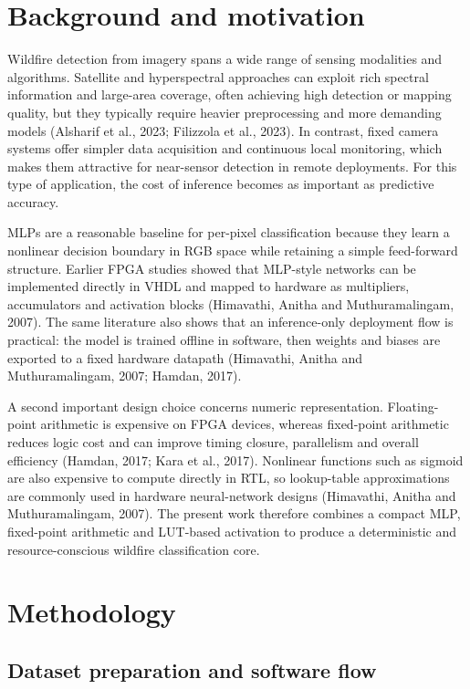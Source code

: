 \documentclass[11pt,a4paper]{article}
\begin{document}
\section{Background and motivation}

Wildfire detection from imagery spans a wide range of sensing modalities and algorithms. Satellite and hyperspectral approaches can exploit rich spectral information and large-area coverage, often achieving high detection or mapping quality, but they typically require heavier preprocessing and more demanding models (Alsharif et al., 2023; Filizzola et al., 2023). In contrast, fixed camera systems offer simpler data acquisition and continuous local monitoring, which makes them attractive for near-sensor detection in remote deployments. For this type of application, the cost of inference becomes as important as predictive accuracy.

MLPs are a reasonable baseline for per-pixel classification because they learn a nonlinear decision boundary in RGB space while retaining a simple feed-forward structure. Earlier FPGA studies showed that MLP-style networks can be implemented directly in VHDL and mapped to hardware as multipliers, accumulators and activation blocks (Himavathi, Anitha and Muthuramalingam, 2007). The same literature also shows that an inference-only deployment flow is practical: the model is trained offline in software, then weights and biases are exported to a fixed hardware datapath (Himavathi, Anitha and Muthuramalingam, 2007; Hamdan, 2017).

A second important design choice concerns numeric representation. Floating-point arithmetic is expensive on FPGA devices, whereas fixed-point arithmetic reduces logic cost and can improve timing closure, parallelism and overall efficiency (Hamdan, 2017; Kara et al., 2017). Nonlinear functions such as sigmoid are also expensive to compute directly in RTL, so lookup-table approximations are commonly used in hardware neural-network designs (Himavathi, Anitha and Muthuramalingam, 2007). The present work therefore combines a compact MLP, fixed-point arithmetic and LUT-based activation to produce a deterministic and resource-conscious wildfire classification core.

\section{Methodology}

\subsection{Dataset preparation and software flow}
\end{document}

